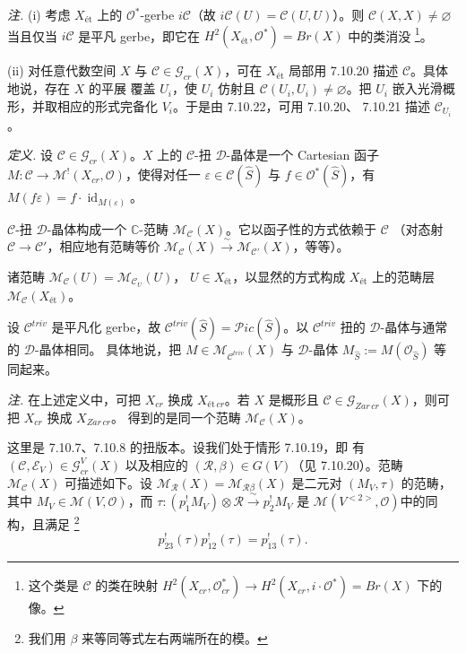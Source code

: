 
 \emph{注.} (i) 考虑 $X_{\text{ét}}$ 上的 $\mathcal{O}^*$-gerbe
$i\mathcal{C}$（故 $i\mathcal{C}(U)=\mathcal{C}(U,U)$）。则
$\mathcal{C}(X,X)\neq\varnothing$ 当且仅当 $i\mathcal{C}$ 是平凡 gerbe，即它在
$H^2(X_{\text{ét}},\mathcal{O}^*)=Br(X)$ 中的类消没%
\footnote{这个类是 $\mathcal{C}$ 的类在映射
$H^2(X_{cr},\mathcal{O}^*_{cr})\to
H^2(X_{cr},i\cdot\mathcal{O}^*)=Br(X)$ 下的像。}。

(ii) 对任意代数空间 $X$ 与 $\mathcal{C}\in\mathcal{G}_{cr}(X)$，可在
$X_{\text{ét}}$ 局部用 7.10.20 描述 $\mathcal{C}$。具体地说，存在 $X$ 的平展
覆盖 $U_i$，使 $U_i$ 仿射且 $\mathcal{C}(U_i,U_i)\neq\varnothing$。把 $U_i$
嵌入光滑概形，并取相应的形式完备化 $V_i$。于是由 7.10.22，可用 7.10.20、
7.10.21 描述 $\mathcal{C}_{U_i}$。

 \emph{定义.} 设 $\mathcal{C}\in\mathcal{G}_{cr}(X)$。$X$ 上的
$\mathcal{C}$-扭 $\mathcal{D}$-晶体是一个 Cartesian 函子
$M:\mathcal{C}\to\mathcal{M}^{!}(X_{cr},\mathcal{O})$，使得对任一
$\varepsilon\in\mathcal{C}(\hat S)$ 与 $f\in\mathcal{O}^*(\hat S)$，有
$M(f\varepsilon)=f\cdot\operatorname{id}_{M(\varepsilon)}$。

$\mathcal{C}$-扭 $\mathcal{D}$-晶体构成一个 $\mathbb{C}$-范畴
$\mathcal{M}_{\mathcal{C}}(X)$。它以函子性的方式依赖于 $\mathcal{C}$
（对态射 $\mathcal{C}\to\mathcal{C}'$，相应地有范畴等价
$\mathcal{M}_{\mathcal{C}}(X)\xrightarrow{\ \sim\ }
\mathcal{M}_{\mathcal{C}'}(X)$，等等）。

诸范畴 $\mathcal{M}_{\mathcal{C}}(U)=\mathcal{M}_{\mathcal{C}_U}(U)$，
$U\in X_{\text{ét}}$，以显然的方式构成 $X_{\text{ét}}$ 上的范畴层
$\mathcal{M}_{\mathcal{C}}(X_{\text{ét}})$。

设 $\mathcal{C}^{triv}$ 是平凡化 gerbe，故
$\mathcal{C}^{triv}(\hat S)=\mathcal{P}ic(\hat S)$。以
$\mathcal{C}^{triv}$ 扭的 $\mathcal{D}$-晶体与通常的 $\mathcal{D}$-晶体相同。
具体地说，把 $M\in\mathcal{M}_{\mathcal{C}^{triv}}(X)$ 与 $\mathcal{D}$-晶体
$M_{\hat S}:=M(\mathcal{O}_{\hat S})$ 等同起来。

\emph{注.} 在上述定义中，可把 $X_{cr}$ 换成
$X_{\text{ét}\,cr}$。若 $X$ 是概形且
$\mathcal{C}\in\mathcal{G}_{Zar\,cr}(X)$，则可把 $X_{cr}$ 换成 $X_{Zar\,cr}$。
得到的是同一个范畴 $\mathcal{M}_{\mathcal{C}}(X)$。

 这里是 7.10.7、7.10.8 的扭版本。设我们处于情形 7.10.19，即
有 $(\mathcal{C},\mathcal{E}_V)\in\mathcal{G}^V_{cr}(X)$ 以及相应的
$(\mathcal{R},\beta)\in G(V)$（见 7.10.20）。范畴
$\mathcal{M}_{\mathcal{C}}(X)$ 可描述如下。设
$\mathcal{M}_{\mathcal{R}}(X)=\mathcal{M}_{\mathcal{R}\beta}(X)$ 是二元对
$(M_V,\tau)$ 的范畴，其中 $M_V\in\mathcal{M}(V,\mathcal{O})$，而
$\tau:(p_1^{!}M_V)\otimes\mathcal{R}\xrightarrow{\ \sim\ }p_2^{!}M_V$
是 $\mathcal{M}(V^{<2>},\mathcal{O})$中的同构，且满足%
\footnote{我们用 $\beta$ 来等同等式左右两端所在的模。}
\begin{equation}\tag{344}
p_{23}^{!}(\tau)p_{12}^{!}(\tau)=p_{13}^{!}(\tau).
\end{equation}

